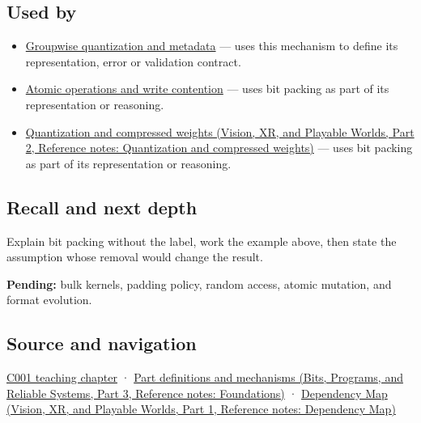 \subsection{Used by}\label{appendix-1f9963e1a5d1-used-by}

\hypertarget{appendix-1f9963e1a5d1-used-by}{}

\begin{itemize}
\item
  \hyperref[appendix-638204c40e8b]{Groupwise quantization and metadata} --- uses this mechanism to define its representation, error or validation contract.
\item
  \hyperref[appendix-e12d1b03fefb]{Atomic operations and write contention} --- uses bit packing as part of its representation or reasoning.
\item
  \href{../07-Vision-XR-and-Playable-Worlds-P02/main.pdf\#nameddest=appendix-fdc7879e8bf2}{Quantization and compressed weights (Vision, XR, and Playable Worlds, Part 2, Reference notes: Quantization and compressed weights)} --- uses bit packing as part of its representation or reasoning.
\end{itemize}

\subsection{Recall and next depth}\label{appendix-1f9963e1a5d1-recall-and-next-depth}

\hypertarget{appendix-1f9963e1a5d1-recall-and-next-depth}{}

Explain bit packing without the label, work the example above, then state the assumption whose removal would change the result.

\textbf{Pending:} bulk kernels, padding policy, random access, atomic mutation, and format evolution.

\subsection{Source and navigation}\label{appendix-1f9963e1a5d1-source-and-navigation}

\hypertarget{appendix-1f9963e1a5d1-source-and-navigation}{}

\hyperref[01-foundations-i-ch001-from-a-signal-to-an-interpretation]{C001 teaching chapter} · \href{../01-Bits-Programs-and-Reliable-Systems-P03/main.pdf\#nameddest=appendix-fd090d982a15}{Part definitions and mechanisms (Bits, Programs, and Reliable Systems, Part 3, Reference notes: Foundations)} · \href{../07-Vision-XR-and-Playable-Worlds-P01/main.pdf\#nameddest=appendix-4ad47bdd269a}{Dependency Map (Vision, XR, and Playable Worlds, Part 1, Reference notes: Dependency Map)}
